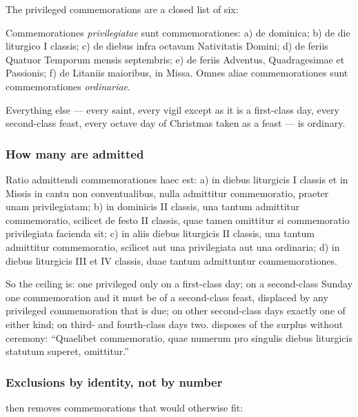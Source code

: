 The privileged commemorations are a closed list of six:

\begin{rulebox}{}
Commemorationes \textit{privilegiatae} sunt commemorationes: a) de dominica;
b) de die liturgico I classis; c) de diebus infra octavam Nativitatis Domini;
d) de feriis Quatuor Temporum mensis septembris; e) de feriis Adventus,
Quadragesimae et Passionis; f) de Litaniis maioribus, in Missa. Omnes aliae
commemorationes sunt commemorationes \textit{ordinariae}.
\end{rulebox}

\noindent
Everything else --- every saint, every vigil except as it is a first-class day,
every second-class feast, every octave day of Christmas taken as a feast --- is
ordinary.

\subsubsection*{How many are admitted}

\begin{rulebox}{}
Ratio admittendi commemorationes haec est: a) in diebus liturgicis I classis
et in Missis in cantu non conventualibus, nulla admittitur commemoratio,
praeter unam privilegiatam; b) in dominicis II classis, una tantum admittitur
commemoratio, scilicet de festo II classis, quae tamen omittitur si
commemoratio privilegiata facienda sit; c) in aliis diebus liturgicis II
classis, una tantum admittitur commemoratio, scilicet aut una privilegiata aut
una ordinaria; d) in diebus liturgicis III et IV classis, duae tantum
admittuntur commemorationes.
\end{rulebox}

So the ceiling is: one privileged only on a first-class day; on a second-class
Sunday one commemoration and it must be of a second-class feast, displaced by
any privileged commemoration that is due; on other second-class days exactly
one of either kind; on third- and fourth-class days two.  disposes of
the surplus without ceremony: ``Quaelibet commemoratio, quae numerum pro
singulis diebus liturgicis statutum superet, omittitur.''

\subsubsection*{Exclusions by identity, not by number}

 then removes commemorations that would otherwise fit:

